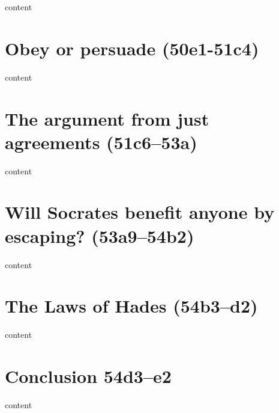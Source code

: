 \documentclass[11pt]{article}
\begin{document}
content

\section{Obey or persuade (50e1-51c4)}

content

\section{The argument from just agreements (51c6--53a)}

content

\section{Will Socrates benefit anyone by escaping? (53a9--54b2)}

content

\section{The Laws of Hades (54b3--d2)}

content

\section{Conclusion 54d3--e2}

content

\newpage


\end{document}
